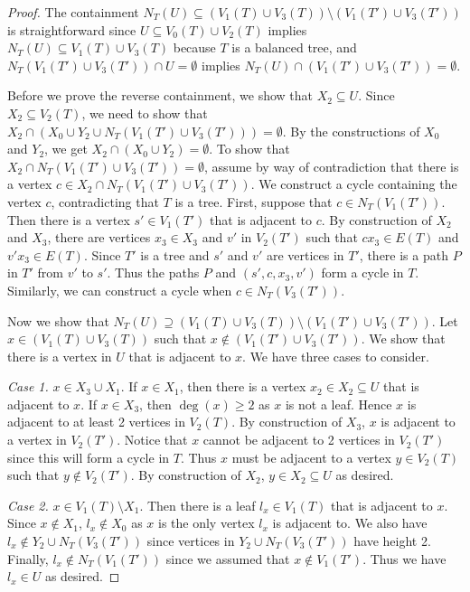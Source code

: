 \documentclass[12pt, reqno]{amsart}
\theoremstyle{definition}
\theoremstyle{plain}
\theoremstyle{definition}
\begin{document}
\begin{proof}
    The containment $N_T(U) \subseteq (V_1(T) \cup V_3(T)) \setminus (V_1(T') \cup V_3(T'))$ is straightforward since $U \subseteq V_0(T) \cup V_2(T)$ implies $N_T(U) \subseteq V_1(T) \cup V_3(T)$ because $T$ is a balanced tree, and $N_T(V_1(T') \cup V_3(T')) \cap U = \emptyset$ implies $N_T(U) \cap (V_1(T') \cup V_3(T')) = \emptyset$.

    Before we prove the reverse containment, we show that $X_2 \subseteq U$.
    Since $X_2 \subseteq V_2(T)$, we need to show that $X_2 \cap (X_0 \cup Y_2 \cup N_T(V_1(T') \cup V_3(T'))) = \emptyset$.
    By the constructions of $X_0$ and $Y_2$, we get $X_2 \cap (X_0 \cup Y_2) = \emptyset$.
    To show that $X_2 \cap N_T(V_1(T') \cup V_3(T')) = \emptyset$, assume by way of contradiction that there is a vertex $c \in X_2 \cap N_T(V_1(T') \cup V_3(T'))$.
    We construct a cycle containing the vertex $c$, contradicting that $T$ is a tree.
    First, suppose that $c \in N_T(V_1(T'))$.
    Then there is a vertex $s' \in V_1(T')$ that is adjacent to $c$.
    By construction of $X_2$ and $X_3$, there are vertices $x_3 \in X_3$ and $v'$ in $V_2(T')$ such that $cx_3 \in E(T)$ and $v'x_3 \in E(T)$.
    Since $T'$ is a tree and $s'$ and $v'$ are vertices in $T'$, there is a path $P$ in $T'$ from $v'$ to $s'$.
    Thus the paths $P$ and $(s',c,x_3,v')$ form a cycle in $T$.
    Similarly, we can construct a cycle when $c \in N_T(V_3(T'))$.

    Now we show that $N_T(U) \supseteq (V_1(T) \cup V_3(T)) \setminus (V_1(T') \cup V_3(T'))$.
    Let $x \in (V_1(T) \cup V_3(T))$ such that $x \not\in (V_1(T') \cup V_3(T'))$.
    We show that there is a vertex in $U$ that is adjacent to $x$.
    We have three cases to consider.

    \emph{Case 1.} $x \in X_3 \cup X_1$.
    If $x \in X_1$, then there is a vertex $x_2 \in X_2 \subseteq U$ that is adjacent to $x$.
    If $x \in X_3$, then $\deg(x) \geq 2$ as $x$ is not a leaf.
    Hence $x$ is adjacent to at least 2 vertices in $V_2(T)$.
    By construction of $X_3$, $x$ is adjacent to a vertex in $V_2(T')$.
    Notice that $x$ cannot be adjacent to 2 vertices in $V_2(T')$ since this will form a cycle in $T$.
    Thus $x$ must be adjacent to a vertex $y \in V_2(T)$ such that $y \not\in V_2(T')$.
    By construction of $X_2$, $y \in X_2 \subseteq U$ as desired.

    \emph{Case 2.} $x \in V_1(T)\setminus X_1$. Then there is a leaf $l_x \in V_1(T)$ that is adjacent to $x$.
    Since $x \not\in X_1$, $l_x \not\in X_0$ as $x$ is the only vertex $l_x$ is adjacent to.
    We also have $l_x \not\in Y_2 \cup N_T(V_3(T'))$ since vertices in $Y_2 \cup N_T(V_3(T'))$ have height 2.
    Finally, $l_x \not\in N_T(V_1(T'))$ since we assumed that $x \not\in V_1(T')$.
    Thus we have $l_x \in U$ as desired.
    

\end{proof}
\end{document}
